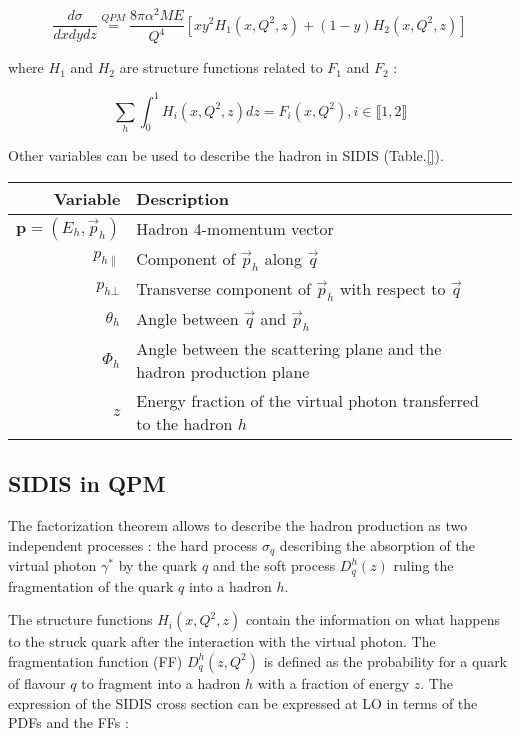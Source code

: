 \begin{equation}
  \frac{d\sigma}{dxdydz} \stackrel{QPM}{=} \frac{8\pi\alpha^2ME}{Q^4}[xy^2H_1(x,Q^2,z)+(1-y)H_2(x,Q^2,z)]
\end{equation}

where $H_1$ and $H_2$ are structure functions related to $F_1$ and $F_2$ \cite{} :

\begin{equation}
  \sum\limits_{h}\int_{0}^{1} H_i(x,Q^2,z)dz = F_i(x,Q^2), i \in  \llbracket1,2\rrbracket
\end{equation}

Other variables can be used to describe the hadron in SIDIS (Table.\ref{}).

\begin{tabularx}{\textwidth}{r|lX}
  \hline
  \hline
  Variable & Description \\
  \hline
  \hline
  $\textbf{p}=(E_h,\vec{p}_h)$ & Hadron 4-momentum vector \\
  $p_{h\|}$ & Component of $\vec{p}_h$ along $\vec{q}$ \\
  $p_{h\bot}$ & Transverse component of $\vec{p}_h$ with respect to $\vec{q}$ \\
  $\theta_h$ & Angle between $\vec{q}$ and $\vec{p}_h$ \\
  $\Phi_h$ & Angle between the scattering plane and the hadron production plane \\
  $z$ & Energy fraction of the virtual photon transferred to the hadron $h$ \\
  \hline
  \hline
\end{tabularx}

\subsection*{SIDIS in QPM}

The factorization theorem allows to describe the hadron production as two independent processes : the hard process $\sigma_q$
describing the absorption of the virtual photon $\gamma^*$ by the quark $q$ and the soft process $D_q^h(z)$ ruling the
fragmentation of the quark $q$ into a hadron $h$.


The structure functions $H_i(x,Q^2,z)$ contain the information on what happens to the struck quark after the interaction with
the virtual photon. The fragmentation function (FF) $D_q^h(z,Q^2)$ is defined as the probability for a quark of flavour $q$ to fragment
into a hadron $h$ with a fraction of energy $z$. The expression of the SIDIS cross section can be expressed at LO in terms of the PDFs and
the FFs \cite{} :

